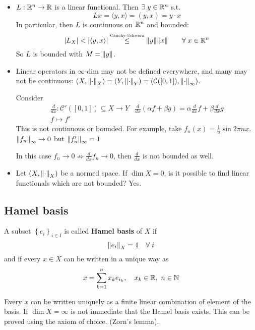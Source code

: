 \begin{example}
    \begin{itemize}
        \item \(L: \mathbb{R}^n \to \mathbb{R}\)  is a linear functional. Then \(\exists \; y \in \mathbb{R}^n\) s.t. 
        \[
            Lx = \langle y, x \rangle = (y, x) = y \cdot x
        \]
        In particular, then \(L\) is continuous on \(\mathbb{R}^n\) and bounded:
        \[
            \abs{L_X} < \abs{\langle y,x \rangle} \overset{\text{\tiny{Cauchy-Schwarz}}}{\leq} \norm{y} \norm{x} \qquad \forall\; x \in \mathbb{R}^n
        \]
        So \(L\) is bounded with \(M=\norm{y}\).
    
        \item Linear operators in \(\infty\)-dim may not be defined everywhere, and many may not be continuous:
        \((X, \norm{\cdot}_X) = (Y, \norm{\cdot}_Y) = (\mathcal{C}([0, 1]), \norm{\cdot}_\infty)\).
        
        Consider 
        \[
            \begin{array}{cc}
                \frac{d}{dx}: \mathcal{C}'([0,1]) \subseteq X \to Y & \frac{d}{dx}(\alpha f + \beta g) = \alpha \frac{d}{dx}f + \beta \frac{d}{dx} g \\
                f \mapsto f'
            \end{array}
        \]
        This is not continuous or bounded. For example, take \(f_n(x) = \frac{1}{n} \sin{2\pi n x}\). \(\norm{f_n}_\infty \to 0\) but \(\norm{f_n'}_\infty =1\)
    
        In this case \(f_n \to 0 \nRightarrow \frac{d}{dx} f_n \to 0\), then \(\frac{d}{dx} \) is not bounded as well.
        \item Let \((X, \norm{\cdot}_X)\) be a normed space. If \(\dim X = 0\), is it possible to find linear functionals which are not bounded? Yes.
    \end{itemize}
    
\end{example}\subsection{Hamel basis}
\begin{definition}
    A subset \(\left\{ e_i \right\}_{i \in I}\) is called \textbf{Hamel basis} of \(X\) if 
    \[
        \norm{e_i}_X = 1 \quad \forall  \; i
    \]
    and if every \(x \in X\) can be written in a unique way as 
    \[
        x = \sum_{k=1}^n x_k e_{i_k}, \quad x_k \in \mathbb{R}, \ n \in \mathbb{N}
    \]
\end{definition}
Every \(x\) can be written uniquely as a finite linear combination of element of the basis.
If \(\dim X = \infty\) is not immediate that the Hamel basis exists. This can be proved using the axiom of choice. (Zorn's lemma). 

